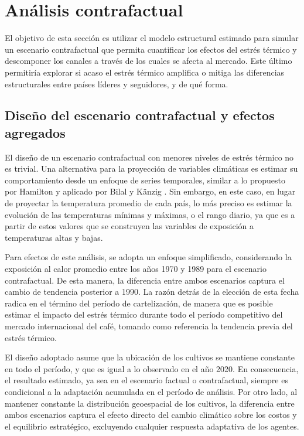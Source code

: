 \chapter{Análisis contrafactual}
\label{chap:contrafactual}

El objetivo de esta sección es utilizar el modelo estructural estimado para simular un escenario contrafactual que permita cuantificar los efectos del estrés térmico y descomponer los canales a través de los cuales se afecta al mercado. Este último permitiría explorar si acaso el estrés térmico amplifica o mitiga las diferencias estructurales entre países líderes y seguidores, y de qué forma.

\section{Diseño del escenario contrafactual y efectos agregados}

El diseño de un escenario contrafactual con menores niveles de estrés térmico no es trivial. Una alternativa para la proyección de variables climáticas es estimar su comportamiento desde un enfoque de series temporales, similar a lo propuesto por Hamilton \citeyearpar{Hamilton2018} y aplicado por Bilal y Känzig \citeyearpar{bilal2024macroeconomic}. Sin embargo, en este caso, en lugar de proyectar la temperatura promedio de cada país, lo más preciso es estimar la evolución de las temperaturas mínimas y máximas, o el rango diario, ya que es a partir de estos valores que se construyen las variables de exposición a temperaturas altas y bajas.

Para efectos de este análisis, se adopta un enfoque simplificado, considerando la exposición al calor promedio entre los años 1970 y 1989 para el escenario contrafactual. De esta manera, la diferencia entre ambos escenarios captura el cambio de tendencia posterior a 1990. La razón detrás de la elección de esta fecha radica en el término del período de cartelización, de manera que es posible estimar el impacto del estrés térmico durante todo el período competitivo del mercado internacional del café, tomando como referencia la tendencia previa del estrés térmico.

El diseño adoptado asume que la ubicación de los cultivos se mantiene constante en todo el período, y que es igual a lo observado en el año 2020. En consecuencia, el resultado estimado, ya sea en el escenario factual o contrafactual, siempre es condicional a la adaptación acumulada en el período de análisis. Por otro lado, al mantener constante la distribución geoespacial de los cultivos, la diferencia entre ambos escenarios captura el efecto directo del cambio climático sobre los costos y el equilibrio estratégico, excluyendo cualquier respuesta adaptativa de los agentes.


